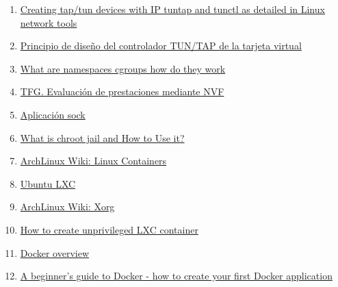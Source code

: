 \documentclass[12pt]{article}
\begin{document}
\begin{enumerate}
		\item
		\label{bib: tunctl + ip}
		\href{https://developpaper.com/creating-tap-tun-devices-with-ip-tuntap-and-tunctl-as-detailed-in-linux-network-tools/}{Creating tap/tun devices with IP tuntap and tunctl as detailed in Linux network tools}
		
		\item
		\label{bib: code tuntap.c}
		\href{https://programmerclick.com/article/45831226469/}{Principio de diseño del controlador TUN/TAP de la tarjeta virtual}
		
		\item
		\label{bib: cgroups}
		\href{https://www.nginx.com/blog/what-are-namespaces-cgroups-how-do-they-work/}{What are namespaces cgroups how do they work}
		
		\item
		\label{bib: virt ligera}
		\href{https://upcommons.upc.edu/handle/2117/78028?show=full}{TFG. Evaluación de prestaciones mediante NVF}
		
		\item
		\label{bib: sock}
		\href{http://www.icir.org/christian/sock.html}{Aplicación sock}
		
		\item
		\label{bib: chroot jail}
		\href{https://phoenixnap.com/kb/chroot-jail}{What is chroot jail and How to Use it?}
		
		\item
		\label{bib: LXC arch}
		\href{https://wiki.archlinux.org/title/Linux_Containers}{ArchLinux Wiki: Linux Containers}
		
		\item
		\label{bib: crear LXC}
		\href{https://ubuntu.com/server/docs/containers-lxc}{Ubuntu LXC}
		
		\item
		\label{bib: xorg arch wiki}
		\href{https://wiki.archlinux.org/title/xorg}{ArchLinux Wiki: Xorg}
		
		\item
		\label{bib: unprivileged LXC}
		\href{https://www.cyberciti.biz/faq/how-to-create-unprivileged-linux-containers-on-ubuntu-linux/}{How to create unprivileged LXC container}
		
		
		\item
		\label{bib: docker info}
		\href{https://docs.docker.com/get-started/overview/}{Docker overview}
		
		\item
		\label{bib: docker dockerfile}
		\href{https://www.freecodecamp.org/news/a-beginners-guide-to-docker-how-to-create-your-first-docker-application-cc03de9b639f/}{A beginner's guide to Docker - how to create your first Docker application}
		

\end{enumerate}
\end{document}
